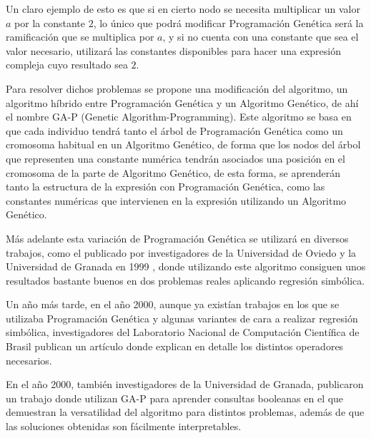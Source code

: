 Un claro ejemplo de esto es que si en cierto nodo se necesita multiplicar un valor $a$ por la constante $2$, lo único que podrá modificar Programación Genética será la ramificación que se multiplica por $a$, y si no cuenta con una constante que sea el valor necesario, utilizará las constantes disponibles para hacer una expresión compleja cuyo resultado sea $2$.

Para resolver dichos problemas se propone una modificación del algoritmo, un algoritmo híbrido entre Programación Genética y un Algoritmo Genético, de ahí el nombre GA-P (Genetic Algorithm-Programming). Este algoritmo se basa en que cada individuo tendrá tanto el árbol de Programación Genética como un cromosoma habitual en un Algoritmo Genético, de forma que los nodos del árbol que representen una constante numérica tendrán asociados una posición en el cromosoma de la parte de Algoritmo Genético, de esta forma, se aprenderán tanto la estructura de la expresión con Programación Genética, como las constantes numéricas que intervienen en la expresión utilizando un Algoritmo Genético.

Más adelante esta variación de Programación Genética se utilizará en diversos trabajos, como el publicado por investigadores de la Universidad de Oviedo y la Universidad de Granada en 1999 \cite{GAPredElectrica}, donde utilizando este algoritmo consiguen unos resultados bastante buenos en dos problemas reales aplicando regresión simbólica.

Un año más tarde, en el año 2000, aunque ya existían trabajos en los que se utilizaba Programación Genética y algunas variantes de cara a realizar regresión simbólica, investigadores del Laboratorio Nacional de Computación Científica de Brasil publican un artículo \cite{PGregresionSimbolica} donde explican en detalle los distintos operadores necesarios.

En el año 2000, también investigadores de la Universidad de Granada, publicaron un trabajo donde utilizan GA-P para aprender consultas booleanas \cite{GAPFormulasBooleanas} en el que demuestran la versatilidad del algoritmo para distintos problemas, además de que las soluciones obtenidas son fácilmente interpretables.



\newpage
